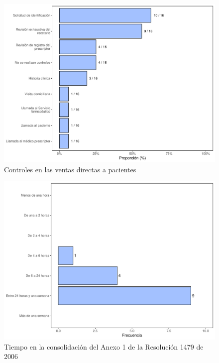 \documentclass[
]{book}
\begin{document}
\begin{figure}
\includegraphics[width=0.85\linewidth]{InformeFinal_files/figure-latex/ControlesVentasFRE-1} \caption{Controles en las ventas directas a pacientes}\label{fig:ControlesVentasFRE}
\end{figure}

\begin{figure}
\includegraphics[width=0.85\linewidth]{InformeFinal_files/figure-latex/TiemposConsolidacionA1-1} \caption{Tiempo en la consolidación del Anexo 1 de la Resolución 1479 de 2006}\label{fig:TiemposConsolidacionA1}
\end{figure}
\end{document}

